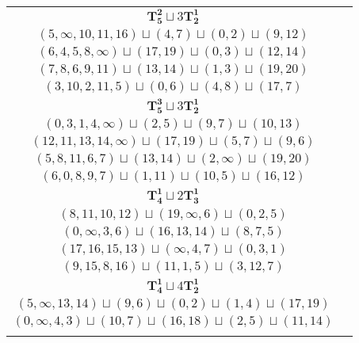 \documentclass{article}
\begin{document}
\begin{longtable}{|c|c|}
        $\mathbf{T_{5}^{2}} \sqcup 3\mathbf{T_{2}^{1}}$ & \begin{tabular}{c}
        $(1,\infty,13,10,7)\sqcup(2,3)\sqcup(16,15)\sqcup(9,11)$ \\ 
        $(5,\infty,10,11,16)\sqcup(4,7)\sqcup(0,2)\sqcup(9,12)$ \\ 
        $(6,4,5,8,\infty)\sqcup(17,19)\sqcup(0,3)\sqcup(12,14)$ \\ 
        $(7,8,6,9,11)\sqcup(13,14)\sqcup(1,3)\sqcup(19,20)$ \\ 
        $(3,10,2,11,5)\sqcup(0,6)\sqcup(4,8)\sqcup(17,7)$
        \end{tabular} \\ 
        \hline
        $\mathbf{T_{5}^{3}} \sqcup 3\mathbf{T_{2}^{1}}$ & \begin{tabular}{c}
        $(1,\infty,13,5,7)\sqcup(2,3)\sqcup(16,15)\sqcup(9,11)$ \\ 
        $(0,3,1,4,\infty)\sqcup(2,5)\sqcup(9,7)\sqcup(10,13)$ \\ 
        $(12,11,13,14,\infty)\sqcup(17,19)\sqcup(5,7)\sqcup(9,6)$ \\ 
        $(5,8,11,6,7)\sqcup(13,14)\sqcup(2,\infty)\sqcup(19,20)$ \\ 
        $(6,0,8,9,7)\sqcup(1,11)\sqcup(10,5)\sqcup(16,12)$
        \end{tabular} \\ 
        \hline
        $\mathbf{T_{4}^{1}} \sqcup 2\mathbf{T_{3}^{1}}$ & \begin{tabular}{c}
        $(11,13,12,15)\sqcup(9,\infty,1)\sqcup(2,4,5)$ \\ 
        $(8,11,10,12)\sqcup(19,\infty,6)\sqcup(0,2,5)$ \\ 
        $(0,\infty,3,6)\sqcup(16,13,14)\sqcup(8,7,5)$ \\ 
        $(17,16,15,13)\sqcup(\infty,4,7)\sqcup(0,3,1)$ \\ 
        $(9,15,8,16)\sqcup(11,1,5)\sqcup(3,12,7)$
        \end{tabular} \\ 
        \hline
        $\mathbf{T_{4}^{1}} \sqcup 4\mathbf{T_{2}^{1}}$ & \begin{tabular}{c}
        $(9,\infty,8,6)\sqcup(12,15)\sqcup(16,17)\sqcup(1,2)\sqcup(19,20)$ \\ 
        $(5,\infty,13,14)\sqcup(9,6)\sqcup(0,2)\sqcup(1,4)\sqcup(17,19)$ \\ 
        $(0,\infty,4,3)\sqcup(10,7)\sqcup(16,18)\sqcup(2,5)\sqcup(11,14)$ \\ 

\end{tabular}
\end{longtable}
\end{document}
